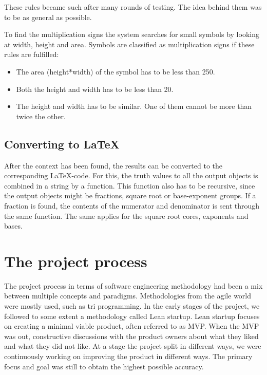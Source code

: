 These rules became such after many rounds of testing. The idea behind them was to be as general as possible.

To find the multiplication signs the system searches for small symbols by looking at width, height and area. Symbols are classified as multiplication signs if these rules are fulfilled:

\begin{itemize}
    \setlength\itemsep{0em}
    \item The area (height*width) of the symbol has to be less than 250.
    \item Both the height and width has to be less than 20.
    \item The height and width has to be similar. One of them cannot be more than twice the other.
\end{itemize}

\subsection{Converting to \LaTeX}
After the context has been found, the results can be converted to the corresponding \LaTeX -code. For this, the truth values to all the output objects is combined in a string by a function. This function also has to be recursive, since the output objects might be fractions, square root or base-exponent groups. If a fraction is found, the contents of the numerator and denominator is sent through the same function. The same applies for the square root cores, exponents and bases.

\section{The project process} %
The project process in terms of software engineering methodology had been a mix between multiple concepts and paradigms. Methodologies from the agile world were mostly used, such as tri programming. In the early stages of the project, we followed to some extent a methodology called Lean startup. Lean startup focuses on creating a minimal viable product, often referred to as \gls{MVP}. When the MVP was out, constructive discussions with the product owners about what they liked and what they did not like. At a stage the project split in different ways, we were continuously working on improving the product in different ways. The primary focus and goal was still to obtain the highest possible accuracy.

